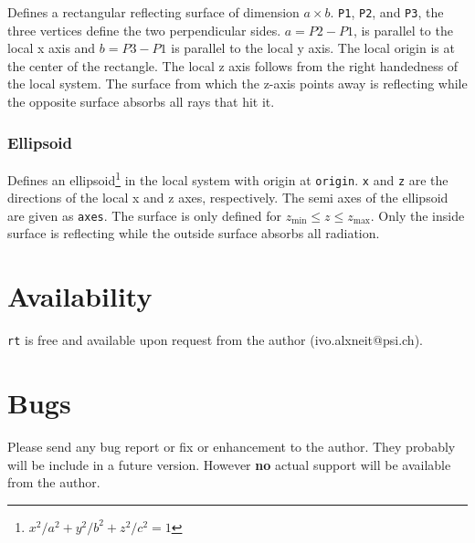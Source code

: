 \documentclass[10pt,a4paper,titlepage]{article}
\newcommand{\rt}{{\tt rt} }
\begin{document}
Defines a rectangular reflecting surface of dimension $a \times b$. {\tt P1}, {\tt P2}, and {\tt P3}, the three vertices define the two perpendicular sides. $a=P2-P1$, is parallel to the local x axis and $b=P3 - P1$ is parallel to the local y axis. The local origin is at the center of the rectangle. The local z axis follows from the right handedness of the local system. The surface from which the z-axis points away is reflecting while the opposite surface absorbs all rays that hit it.

\subsubsection{Ellipsoid}










Defines an ellipsoid\footnote{${x^2}/{a^2}+{y^2}/{b^2}+{z^2}/{c^2}=1$} in the local system with origin at {\tt origin}. {\tt x} and {\tt z} are the directions of the local x and z axes, respectively. The semi axes of the ellipsoid are given as {\tt axes}. The surface is only defined for $z_\mathrm{min} \leq z \leq z_\mathrm{max}$. Only the inside surface is reflecting while the outside surface absorbs all radiation.


\section{Availability}
\rt is free and available upon request from the author (ivo.alxneit@psi.ch).



\section{Bugs} Please send any bug report or fix or enhancement to the author. They probably will be include in a future version. However {\bf no} actual support will be available from the author.
\end{document}
